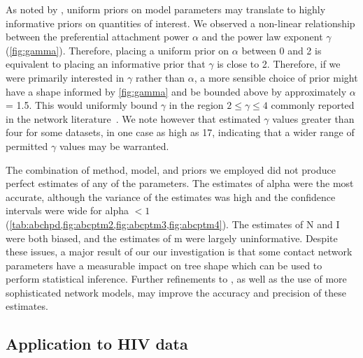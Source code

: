 As noted by \textcite{lintusaari2016identifiability}, uniform priors on model
parameters may translate to highly informative priors on quantities of
interest. We observed a non-linear relationship between the preferential
attachment power $\alpha$ and the power law exponent $\gamma$
(\cref{fig:gamma}). Therefore, placing a uniform prior on $\alpha$ between 0
and 2 is equivalent to placing an informative prior that $\gamma$ is close to
2. Therefore, if we were primarily interested in $\gamma$ rather than
$\alpha$, a more sensible choice of prior might have a shape informed by
\cref{fig:gamma} and be bounded above by approximately $\alpha$ = 1.5. This
would uniformly bound $\gamma$ in the region $2 \leq \gamma \leq 4$ commonly
reported in the network literature~\autocite{liljeros2001web,
schneeberger2004scale, colgate1989risk, brown2011transmission}. We note however
that \textcite{jones2003assessment} estimated $\gamma$ values greater than
four for some datasets, in one case as high as 17, indicating that a wider
range of permitted $\gamma$ values may be warranted.

The combination of method, model, and priors we employed did not produce
perfect estimates of any of the parameters. The estimates of \gls{alpha} were
the most accurate, although the variance of the estimates was high and the
confidence intervals were wide for \gls{alpha} $< 1$
(\cref{tab:abchpd,fig:abcptm2,fig:abcptm3,fig:abcptm4}). The estimates of
\gls{N} and \gls{I} were both biased, and the estimates of \gls{m} were largely
uninformative. Despite these issues, a major result of our our investigation is
that some contact network parameters have a measurable impact on tree shape
which can be used to perform statistical inference. Further refinements to
, as well as the use of more sophisticated network models, may
improve the accuracy and precision of these estimates.

\subsection{Application to HIV data}

